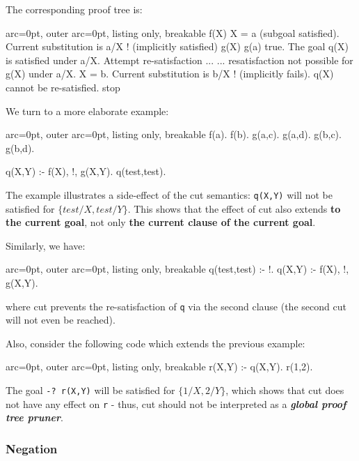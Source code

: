 The corresponding proof tree is:

\begin{tcblisting}{ arc=0pt, outer arc=0pt, listing only, breakable}
f(X)
  X = a (subgoal satisfied). Current substitution is {a/X}
    ! (implicitly satisfied)
    g(X)
      g(a) true. The goal q(X) is satisfied under {a/X}. Attempt re-satisfaction ...
      ... resatisfaction not possible for g(X) under {a/X}.
  X = b. Current substitution is {b/X}
    ! (implicitly fails). 
q(X) cannot be re-satisfied. stop

\end{tcblisting}


We turn to a more elaborate example:

\begin{tcblisting}{ arc=0pt, outer arc=0pt, listing only, breakable}
f(a).
f(b).
g(a,c).
g(a,d).
g(b,c).
g(b,d).
  
q(X,Y) :- f(X), !, g(X,Y).
q(test,test).

\end{tcblisting}


The example illustrates a side-effect of the cut semantics: \texttt{q(X,Y)} will not be satisfied for $\{test/X,test/Y\}$. This shows that the effect of cut also extends \textbf{to the current goal}, not only \textbf{the current clause of the current goal}.

Similarly, we have:

\begin{tcblisting}{ arc=0pt, outer arc=0pt, listing only, breakable}
q(test,test) :- !.
q(X,Y) :- f(X), !, g(X,Y).

\end{tcblisting}


where cut prevents the re-satisfaction of \texttt{q} via the second clause (the second cut will not even be reached). 

Also, consider the following code which extends the previous example:

\begin{tcblisting}{ arc=0pt, outer arc=0pt, listing only, breakable}
r(X,Y) :- q(X,Y).
r(1,2).

\end{tcblisting}


The goal \texttt{-? r(X,Y)} will be satisfied for $\{1/X,2/Y\}$, which shows that cut does not have any effect on \texttt{r} - thus, cut should not be interpreted as a \textit{\textbf{global proof tree pruner}}.

\subsubsection*{ Negation }

